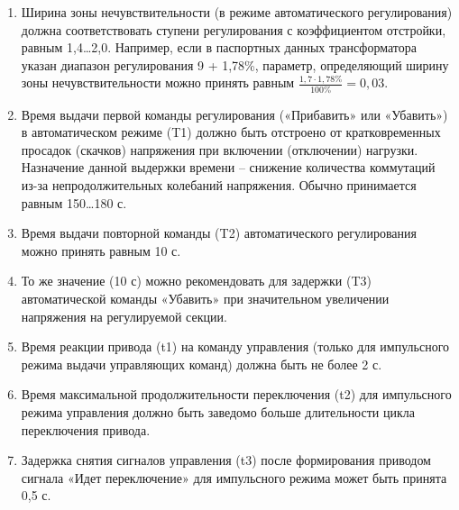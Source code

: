 \begin{enumerate}
\item
Ширина  зоны  нечувствительности  (в  режиме  автоматического  регулирования)  должна соответствовать ступени регулирования с коэффициентом отстройки, равным 1,4…2,0. Например, если в 
паспортных  данных    трансформатора  указан  диапазон  регулирования  9  +  1,78\%,  параметр, определяющий ширину зоны нечувствительности можно принять равным $\frac{1,7 · 1,78\%}{100\%} = 0,03$.

\item
Время  выдачи  первой  команды  регулирования  («Прибавить»  или  «Убавить»)  в  автоматическом режиме (T1) должно быть отстроено от кратковременных просадок (скачков) напряжения при включении (отключении) нагрузки. Назначение данной выдержки времени – снижение количества коммутаций из-за непродолжительных колебаний напряжения. Обычно принимается равным 150…180 с.

\item
Время выдачи повторной команды (T2) автоматического регулирования можно принять равным 10 с.

\item
То же значение (10 с) можно рекомендовать для задержки (T3) автоматической команды «Убавить» при значительном увеличении напряжения на регулируемой секции.

\item
Время  реакции  привода  (t1)  на  команду  управления  (только  для  импульсного  режима  выдачи управляющих команд) должна быть не более 2 с.

\item
Время  максимальной продолжительности переключения (t2) для импульсного режима управления должно быть заведомо больше длительности цикла переключения привода. 

\item
Задержка  снятия  сигналов  управления  (t3)  после  формирования  приводом  сигнала  «Идет переключение» для импульсного режима может быть принята 0,5 с. 

\end{enumerate}




